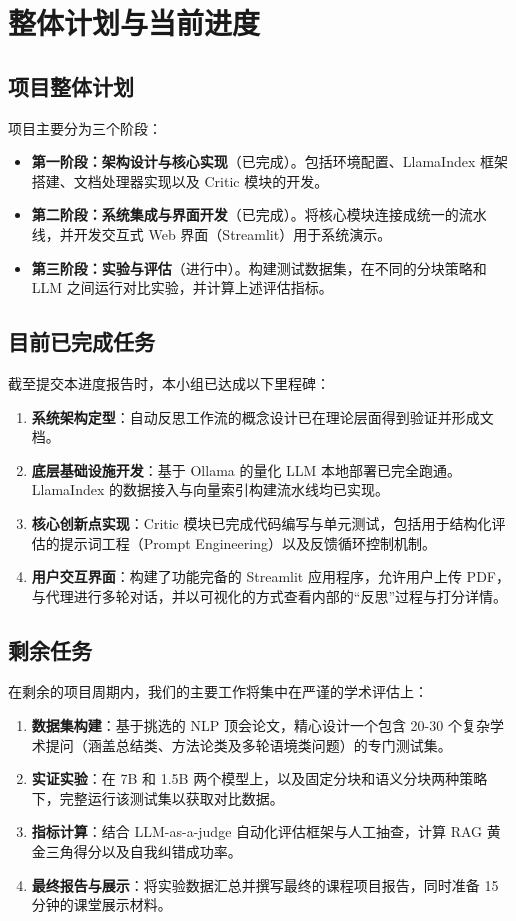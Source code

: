 \documentclass[11pt,a4paper]{article}
\begin{document}
\section{整体计划与当前进度}

\subsection{项目整体计划}
项目主要分为三个阶段：
\begin{itemize}
    \item \textbf{第一阶段：架构设计与核心实现}（已完成）。包括环境配置、LlamaIndex 框架搭建、文档处理器实现以及 Critic 模块的开发。
    \item \textbf{第二阶段：系统集成与界面开发}（已完成）。将核心模块连接成统一的流水线，并开发交互式 Web 界面（Streamlit）用于系统演示。
    \item \textbf{第三阶段：实验与评估}（进行中）。构建测试数据集，在不同的分块策略和 LLM 之间运行对比实验，并计算上述评估指标。
\end{itemize}

\subsection{目前已完成任务}
截至提交本进度报告时，本小组已达成以下里程碑：
\begin{enumerate}
    \item \textbf{系统架构定型}：自动反思工作流的概念设计已在理论层面得到验证并形成文档。
    \item \textbf{底层基础设施开发}：基于 Ollama 的量化 LLM 本地部署已完全跑通。LlamaIndex 的数据接入与向量索引构建流水线均已实现。
    \item \textbf{核心创新点实现}：Critic 模块已完成代码编写与单元测试，包括用于结构化评估的提示词工程（Prompt Engineering）以及反馈循环控制机制。
    \item \textbf{用户交互界面}：构建了功能完备的 Streamlit 应用程序，允许用户上传 PDF，与代理进行多轮对话，并以可视化的方式查看内部的“反思”过程与打分详情。
\end{enumerate}

\subsection{剩余任务}
在剩余的项目周期内，我们的主要工作将集中在严谨的学术评估上：
\begin{enumerate}
    \item \textbf{数据集构建}：基于挑选的 NLP 顶会论文，精心设计一个包含 20-30 个复杂学术提问（涵盖总结类、方法论类及多轮语境类问题）的专门测试集。
    \item \textbf{实证实验}：在 7B 和 1.5B 两个模型上，以及固定分块和语义分块两种策略下，完整运行该测试集以获取对比数据。
    \item \textbf{指标计算}：结合 LLM-as-a-judge 自动化评估框架与人工抽查，计算 RAG 黄金三角得分以及自我纠错成功率。
    \item \textbf{最终报告与展示}：将实验数据汇总并撰写最终的课程项目报告，同时准备 15 分钟的课堂展示材料。
\end{enumerate}
\end{document}

